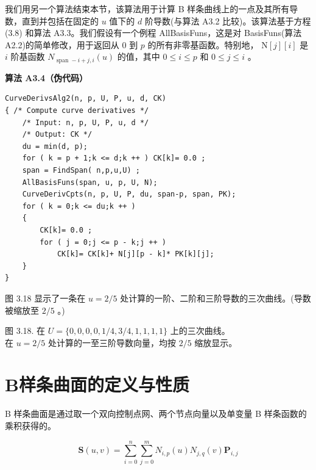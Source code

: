\documentclass[../main.tex]{subfiles}
\begin{document}
我们用另一个算法结束本节，该算法用于计算 B 样条曲线上的一点及其所有导数，直到并包括在固定的 \(u\) 值下的 \(d\) 阶导数(与算法 A3.2 比较)。该算法基于方程 (3.8) 和算法 A3.3。我们假设有一个例程 AllBasisFuns，这是对 BasisFuns(算法 A2.2)的简单修改，用于返回从 0 到 \(p\) 的所有非零基函数。特别地， \(\mathrm{N}\left\lbrack  j\right\rbrack  \left\lbrack  i\right\rbrack\) 是 \(i\) 阶基函数 \({N}_{\text{ span } - i + j,i}\left( u\right)\) 的值，其中 \(0 \leq  i \leq  p\) 和 \(0 \leq  j \leq  i\) 。

\par\medskip\noindent\textbf{算法 A3.4（伪代码）}\par
\begin{verbatim}
CurveDerivsAlg2(n, p, U, P, u, d, CK)
{ /* Compute curve derivatives */
    /* Input: n, p, U, P, u, d */
    /* Output: CK */
    du = min(d, p);
    for ( k = p + 1;k <= d;k ++ ) CK[k]= 0.0 ;
    span = FindSpan( n,p,u,U) ;
    AllBasisFuns(span, u, p, U, N);
    CurveDerivCpts(n, p, U, P, du, span-p, span, PK);
    for ( k = 0;k <= du;k ++ )
    {
        CK[k]= 0.0 ;
        for ( j = 0;j <= p - k;j ++ )
            CK[k]= CK[k]+ N[j][p - k]* PK[k][j];
    }
}
\end{verbatim}

图 3.18 显示了一条在 \(u = 2/5\) 处计算的一阶、二阶和三阶导数的三次曲线。(导数被缩放至 \(2/5\) 。)



\begin{center}
\begin{minipage}{18cm}
\vspace*{.6\baselineskip}
\centering
{}
\par\smallskip
图 3.18. 在 \(U=\{0,0,0,0,1/4,3/4,1,1,1,1\}\) 上的三次曲线。\\ 在 \(u=2/5\) 处计算的一至三阶导数向量，均按 \(2/5\) 缩放显示。
\end{minipage}
\end{center}

\section{B样条曲面的定义与性质}

B 样条曲面是通过取一个双向控制点网、两个节点向量以及单变量 B 样条函数的乘积获得的。

\[
\mathbf{S}\left( {u,v}\right)  = \mathop{\sum }\limits_{{i = 0}}^{n}\mathop{\sum }\limits_{{j = 0}}^{m}{N}_{i,p}\left( u\right) {N}_{j,q}\left( v\right) {\mathbf{P}}_{i,j} \tag{3.11}
\]
\end{document}
